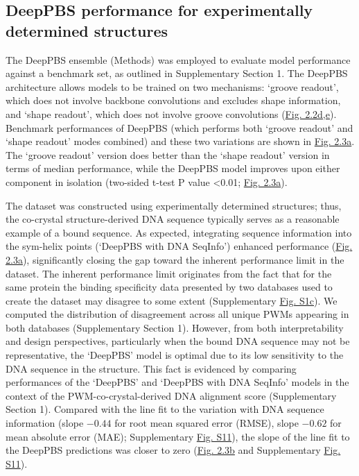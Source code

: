 \subsection{DeepPBS performance for experimentally determined structures}
The DeepPBS ensemble (Methods) was employed to evaluate model performance against a benchmark set, as outlined in Supplementary Section 1. The DeepPBS architecture allows models to be trained on two mechanisms: ‘groove readout’, which does not involve backbone convolutions and excludes shape information, and ‘shape readout’, which does not involve groove convolutions (\hyperref[fig:pdna1]{Fig. 2.2d,e}). Benchmark performances of DeepPBS (which performs both ‘groove readout’ and ‘shape readout’ modes combined) and these two variations are shown in \hyperref[fig:pdna2]{Fig. 2.3a}. The ‘groove readout’ version does better than the ‘shape readout’ version in terms of median performance, while the DeepPBS model improves upon either component in isolation (two-sided t-test P value <0.01; \hyperref[fig:pdna2]{Fig. 2.3a}). 
\par
The dataset was constructed using experimentally determined structures; thus, the co-crystal structure-derived DNA sequence typically serves as a reasonable example of a bound sequence. As expected, integrating sequence information into the sym-helix points (‘DeepPBS with DNA SeqInfo’) enhanced performance (\hyperref[fig:pdna2]{Fig. 2.3a}), significantly closing the gap toward the inherent performance limit in the dataset. The inherent performance limit originates from the fact that for the same protein the binding specificity data presented by two databases \citep{Jaime2022, kulakovskiy2018hocomoco} used to create the dataset may disagree to some extent (Supplementary \hyperref[fig:pdnaS1]{Fig. S1c}). We computed the distribution of disagreement across all unique PWMs appearing in both databases (Supplementary Section 1). However, from both interpretability and design perspectives, particularly when the bound DNA sequence may not be representative, the ‘DeepPBS’ model is optimal due to its low sensitivity to the DNA sequence in the structure. This fact is evidenced by comparing performances of the ‘DeepPBS’ and ‘DeepPBS with DNA SeqInfo’ models in the context of the PWM-co-crystal-derived DNA alignment score (Supplementary Section 1). Compared with the line fit to the variation with DNA sequence information (slope $-0.44$ for root mean squared error (RMSE), slope $-0.62$ for mean absolute error (MAE); Supplementary \hyperref[fig:pdnaS11]{Fig. S11}), the slope of the line fit to the DeepPBS predictions was closer to zero (\hyperref[fig:pdna2]{Fig. 2.3b} and Supplementary \hyperref[fig:pdnaS11]{Fig. S11}).
